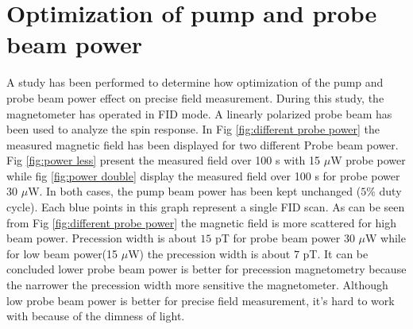    \section{Optimization of pump and probe beam power} 
 A study has been performed to determine how optimization of the pump and probe beam power effect on precise field measurement.  During this study, the magnetometer has operated in FID mode.  A  linearly polarized probe beam has been used to analyze the spin response. In Fig \ref{fig:different probe power} the measured magnetic field has been displayed for two different  Probe beam power. Fig \ref{fig:power less} present the measured field over 100 s with 15 $\mu$W probe power while fig \ref{fig:power double} display the measured field over 100 s for probe power 30 $\mu$W. In both cases, the pump beam power has been kept unchanged ($5\%$ duty cycle). Each blue points in this graph represent a single FID scan. As can be seen from Fig \ref{fig:different probe power} the magnetic field is more scattered for high beam power. Precession width is about $15$ pT for probe beam power 30 $\mu$W while for low beam power(15 $\mu$W) the precession width is about $7$ pT. It can be concluded lower probe beam power is better for precession  magnetometry because the narrower the precession width more sensitive the magnetometer. Although low probe beam power is better for precise field measurement, it's hard to work with because of the dimness of light.
